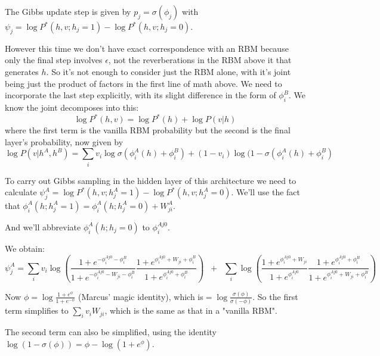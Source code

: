
The Gibbs update step is given by $p_j = \sigma(\phi_j) $ with
$ \psi_j = \log P^*(h,v ; h_j =1 ) - \log P^*(h,v ; h_j = 0)$.

However this time we don't have exact correspondence with an RBM because only the final step involves $\epsilon$, not the reverberations in the RBM above it that generates $h$. So it's not enough to consider just the RBM alone, with it's joint being just the product of factors in the first line of math above. We need to incorporate the last step explicitly, with its slight difference in the form of $\phi^B_i$. We know the joint decomposes into this:
$$ \log P^* (h,v) = \log P^*(h) + \log P(v|h)$$
where the first term is the vanilla RBM probability but the second is the final layer's probability, now given by
$$ \log P(v|h^A,h^B) = \sum_i v_i \log \sigma (\phi^A_i(h) + \phi^B_i) + (1-v_i) \log (1 - \sigma(\phi^A_i(h) + \phi^B_i)$$

To carry out Gibbs sampling in the hidden layer of this architecture we need to calculate $\psi^A_j = \log P^*(h,v ; h^A_j =1 ) - \log P^*(h,v ; h^A_j = 0)$. We'll use the fact that $\phi^A_i(h ; h^A_j=1) = \phi^A_i(h ; h^A_j=0) + W^A_{ji}$.

And we'll abbreviate $\phi^A_i(h ; h_j=0)$ to $\phi^{Aj0}_i$.

We obtain:
$$\psi^A_j = \sum_i v_i \log \left( \frac{1+ e^{-\phi^{Aj0}_i - \phi^B_i}}{1+e^{-\phi^{Aj0}_i - W_{ji} -\phi^B_i}} \frac{1+ e^{\phi^{Aj0}_i + W_{ji} + \phi^B_i}}{1+e^{\phi_i^{Aj0} + \phi^B_i}}\right) \;\;+ \;\;\sum_i \log \left(\frac{1+e^{\phi_i^{Aj0} + W_{ji}}}{1+ e^{\phi_i^{Aj0}}}
\frac{1+e^{\phi_i^{Aj0} + \phi^B_i}}{1+ e^{\phi_i^{Aj0} + W_{ji} + \phi^B_i}} \right)
$$

Now $\phi = \log \frac{1+e^{\phi}}{1+e^{-\phi}}$ (Marcus' magic identity), which is$ = \log \frac{\sigma(\phi)}{\sigma(-\phi)}$.
So the first term simplifies to
$ \sum_i v_i W_{ji}$, which is the same as that in a "vanilla RBM".

The second term can also be simplified, using the identity $\log(1-\sigma(\phi)) = \phi - \log(1+e^\phi)$.

